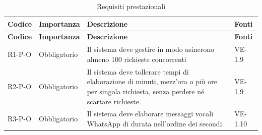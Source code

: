 {
    \small
    \renewcommand{\arraystretch}{1.3}
    \begin{longtable}{|>{\raggedright\arraybackslash}p{1.8cm}|>{\raggedright\arraybackslash}p{2.3cm}|>{\raggedright\arraybackslash}p{6.6cm}|>{\raggedright\arraybackslash}p{3.1cm}|}
    \caption{Requisiti prestazionali}\label{tab:req-prestazionali}\\
    \hline
    \rowcolor[gray]{0.88} \textbf{Codice} & \textbf{Importanza} & \textbf{Descrizione} & \textbf{Fonti} \\ \hline
    \endfirsthead
    \hline
    \rowcolor[gray]{0.88} \textbf{Codice} & \textbf{Importanza} & \textbf{Descrizione} & \textbf{Fonti} \\ \hline
    \endhead
    \mbox{R1-P-O} & Obbligatorio & Il sistema deve gestire in modo asincrono almeno 100 richieste concorrenti & \mbox{VE-1.9} \\ \hline
    \mbox{R2-P-O} & Obbligatorio & Il sistema deve tollerare tempi di elaborazione di minuti, mezz'ora o più ore per singola richiesta, senza perdere né scartare richieste. & \mbox{VE-1.9} \\ \hline
    \mbox{R3-P-O} & Obbligatorio & Il sistema deve elaborare messaggi vocali WhatsApp di durata nell'ordine dei secondi. & \mbox{VE-1.10} \\ \hline
    \end{longtable}
}